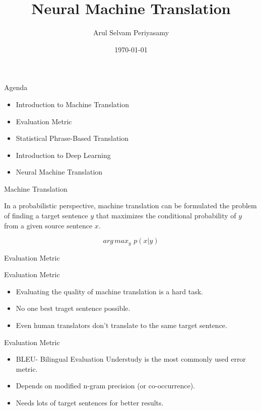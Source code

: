 ﻿\documentclass[table,aspectratio=43,mathserif,xcolor={usenames,dvipsnames,svgnames,table},10pt]{beamer}
\title[NMT]{Neural Machine Translation}
\author[Arul Selvam Periyasamy]{Arul Selvam Periyasamy}
\institute[University of Bonn]{Rheinische Friedrich-Wilhelms-Universit\"at Bonn\\
Seminar: Natural Language Processing}
\date{\today}
\begin{document}
\maketitle


\begin{frame}{Agenda}
 \begin{itemize}
  \item<+-> Introduction to Machine Translation
  \item<+-> Evaluation Metric
  \item<+-> Statistical Phrase-Based Translation
  \item<+-> Introduction to Deep Learning
  \item<+-> Neural Machine Translation

 \end{itemize}
\end{frame}



\begin{frame}{Machine Translation}

In a probabilistic perspective, machine translation can be formulated the problem of finding a target sentence $y$ that maximizes the conditional probability of $y$ from a given source sentence $x$.

$$ arg\,max _{y}  \,\, p(x|y)$$
\end{frame}


\begin{section}{Evaluation Metric}
\end{section}

\begin{frame}{Evaluation Metric}
\begin{itemize}
 \item<+-> Evaluating the quality of machine translation is a hard task.
 \item<+-> No one best traget sentence possible.
 \item<+-> Even human translators don't translate to the same target sentence.
 \end{itemize}
\end{frame}

\begin{frame}{Evaluation Metric}
\begin{itemize}
 \item<+-> BLEU- Bilingual Evaluation Understudy is the most commonly used error metric.
 \item<+-> Depends on modified n-gram precision (or co-occurrence).
 \item<+-> Needs lots of target sentences for better results.
 \end{itemize}
\end{frame}
\end{document}
